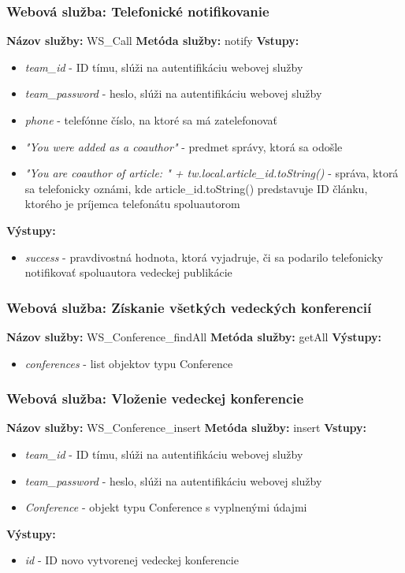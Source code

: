 \documentclass[10pt,oneside,slovak,a4paper]{article}
\begin{document}
\subsubsection{Webová služba: Telefonické notifikovanie}
\textbf{Názov služby:} WS\_Call
\textbf{Metóda služby:} notify
\textbf{Vstupy:}
	\begin{itemize}
		\item \textit{team\_id} - ID tímu, slúži na autentifikáciu webovej služby
		\item \textit{team\_password} - heslo, slúži na autentifikáciu webovej služby
		\item \textit{phone} - telefónne číslo, na ktoré sa má zatelefonovať
		\item \textit{"You were added as a coauthor"} - predmet správy, ktorá sa odošle
		\item \textit{"You are coauthor of article: " + tw.local.article\_id.toString()} - správa, ktorá sa telefonicky oznámi, kde article\_id.toString() predstavuje ID článku, ktorého je príjemca telefonátu spoluautorom
	\end{itemize}
\textbf{Výstupy:}
	\begin{itemize}
		\item \textit{success} - pravdivostná hodnota, ktorá vyjadruje, či sa podarilo telefonicky notifikovať spoluautora vedeckej publikácie
	\end{itemize}
	
\subsubsection{Webová služba: Získanie všetkých vedeckých konferencií}
\textbf{Názov služby:} WS\_Conference\_findAll
\textbf{Metóda služby:} getAll
\textbf{Výstupy:}
	\begin{itemize}
		\item \textit{conferences} - list objektov typu Conference
	\end{itemize}
	
\subsubsection{Webová služba: Vloženie vedeckej konferencie}
\textbf{Názov služby:} WS\_Conference\_insert
\textbf{Metóda služby:} insert
\textbf{Vstupy:}
	\begin{itemize}
		\item \textit{team\_id} - ID tímu, slúži na autentifikáciu webovej služby
		\item \textit{team\_password} - heslo, slúži na autentifikáciu webovej služby
		\item \textit{Conference} - objekt typu Conference s vyplnenými údajmi
	\end{itemize}
\textbf{Výstupy:}
	\begin{itemize}
		\item \textit{id} - ID novo vytvorenej vedeckej konferencie
	\end{itemize}
	
\end{document}
